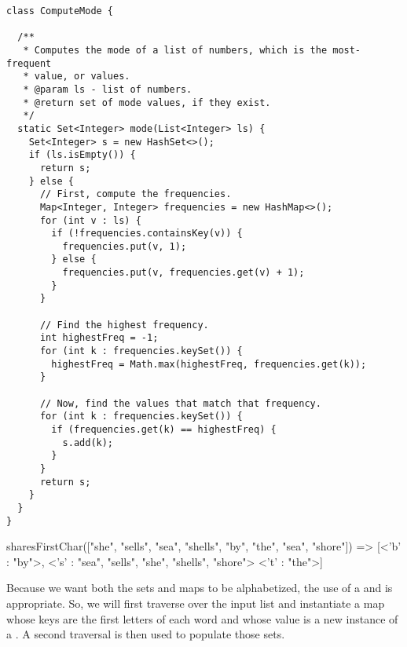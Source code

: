 \begin{cl}[]{}
\begin{lstlisting}[language=MyJava]
class ComputeMode {

  /**
   * Computes the mode of a list of numbers, which is the most-frequent
   * value, or values.
   * @param ls - list of numbers.
   * @return set of mode values, if they exist.
   */
  static Set<Integer> mode(List<Integer> ls) {
    Set<Integer> s = new HashSet<>();
    if (ls.isEmpty()) {
      return s;
    } else {
      // First, compute the frequencies.
      Map<Integer, Integer> frequencies = new HashMap<>();
      for (int v : ls) {
        if (!frequencies.containsKey(v)) {
          frequencies.put(v, 1);
        } else {
          frequencies.put(v, frequencies.get(v) + 1);
        }
      } 

      // Find the highest frequency.
      int highestFreq = -1;
      for (int k : frequencies.keySet()) {
        highestFreq = Math.max(highestFreq, frequencies.get(k));
      }

      // Now, find the values that match that frequency.
      for (int k : frequencies.keySet()) {
        if (frequencies.get(k) == highestFreq) {
          s.add(k);
        }
      }
      return s;
    }
  }
}
\end{lstlisting}
\end{cl}


\begin{verbnobox}[\small]
sharesFirstChar(["she", "sells", "sea", "shells", "by", "the", "sea", "shore"])
  => [<'b' : {"by"}>, 
      <'s' : {"sea", "sells", "she", "shells", "shore"}>
      <'t' : {"the"}>]
\end{verbnobox}

Because we want both the sets and maps to be alphabetized, the use of a  and  is appropriate. So, we will first traverse over the input list and instantiate a map whose keys are the first letters of each word and whose value is a new instance of a . A second traversal is then used to populate those sets.


